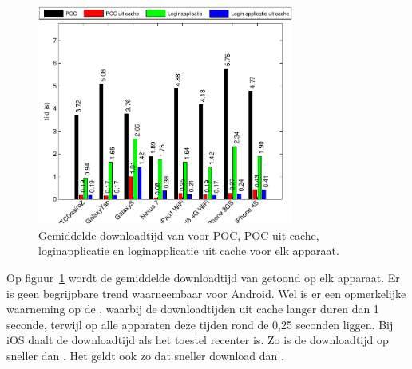 
\section{\lungo}
\label{app:performantie-lungo}

\begin{figure}
  \centering
  \includegraphics[width=0.75\textwidth]{figuren/performance-lungo.pdf}
  \caption{Gemiddelde downloadtijd van \lungo{} voor POC,  POC uit cache,  loginapplicatie en loginapplicatie uit cache voor elk apparaat.}
  \label{fig:performantie-lungo}
\end{figure}

Op figuur~\ref{fig:performantie-lungo} wordt de gemiddelde downloadtijd van \lungo{} getoond op elk apparaat.
Er is geen begrijpbare trend waarneembaar voor Android.
Wel is er een opmerkelijke waarneming op de \gs{}, waarbij de downloadtijden uit cache langer duren dan 1 seconde, terwijl op alle apparaten deze tijden rond de 0,25 seconden liggen.
Bij iOS daalt de downloadtijd als het toestel recenter is.
Zo is de downloadtijd op \ipadiii{} sneller dan \ipadi{}.
Het geldt ook zo dat \iphoneiv{} sneller download dan \iphoneiii{}.

